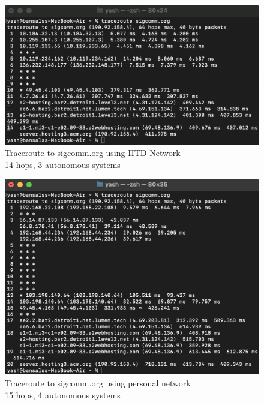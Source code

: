 \documentclass{article}
\begin{document}
    \begin{figure}[H]
    \centering
    \includegraphics[width=\textwidth]{trace_sigcomm_iitd_ipv4.png}
    \caption*{Traceroute to sigcomm.org using IITD Network\\
    14 hops, 3 autonomous systems}
    \end{figure}

    \begin{figure}[H]
    \centering
    \includegraphics[width=\textwidth]{trace_sigcomm_personal_ipv4.png}
    \caption*{Traceroute to sigcomm.org using personal network\\
    15 hops, 4 autonomous systems}
    \end{figure}
\end{document}
